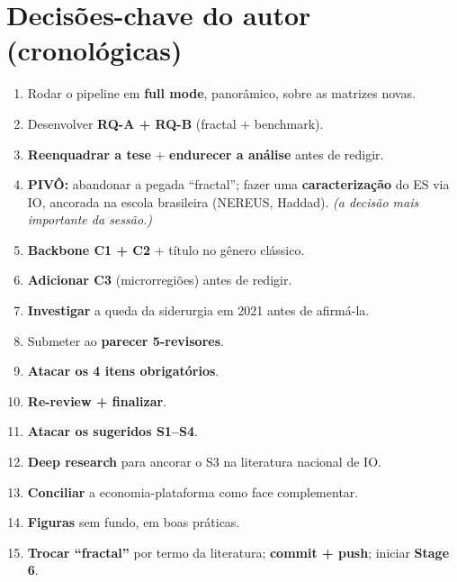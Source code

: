 \documentclass[12pt,a4paper]{article}
\begin{document}
\section{Decisões-chave do autor (cronológicas)}
\begin{enumerate}\setlength\itemsep{1pt}
\item Rodar o pipeline em \textbf{full mode}, panorâmico, sobre as matrizes novas.
\item Desenvolver \textbf{RQ-A + RQ-B} (fractal + benchmark).
\item \textbf{Reenquadrar a tese} + \textbf{endurecer a análise} antes de redigir.
\item \textbf{PIVÔ:} abandonar a pegada ``fractal''; fazer uma \textbf{caracterização} do ES via IO,
  ancorada na escola brasileira (NEREUS, Haddad). \emph{(a decisão mais importante da sessão.)}
\item \textbf{Backbone C1 + C2} + título no gênero clássico.
\item \textbf{Adicionar C3} (microrregiões) antes de redigir.
\item \textbf{Investigar} a queda da siderurgia em 2021 antes de afirmá-la.
\item Submeter ao \textbf{parecer 5-revisores}.
\item \textbf{Atacar os 4 itens obrigatórios}.
\item \textbf{Re-review + finalizar}.
\item \textbf{Atacar os sugeridos S1--S4}.
\item \textbf{Deep research} para ancorar o S3 na literatura nacional de IO.
\item \textbf{Conciliar} a economia-plataforma como face complementar.
\item \textbf{Figuras} sem fundo, em boas práticas.
\item \textbf{Trocar ``fractal''} por termo da literatura; \textbf{commit + push}; iniciar \textbf{Stage 6}.
\end{enumerate}

\end{document}
